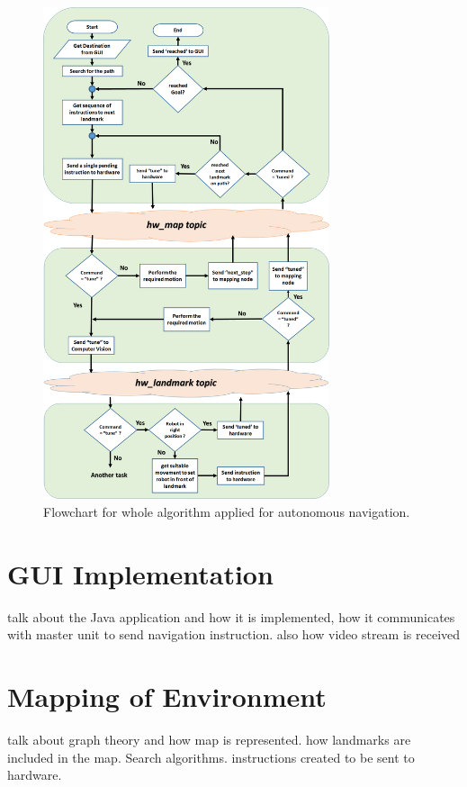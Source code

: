 \documentclass[12pt]{article}
\begin{document}
\newpage

\begin{figure}
	\centering
	\includegraphics[width =0.75\textwidth]{Fig/full-algorithm.png}
	\caption{Flowchart for whole algorithm applied for autonomous navigation.}
	\label{fig:full-algorithm}
\end{figure}

\newpage
\clearpage
\newpage

\section{GUI Implementation}
talk about the Java application and how it is implemented, how it communicates with master unit to send navigation instruction. also how video stream is received

\newpage

\section{Mapping of Environment}
talk about graph theory and how map is represented. 
how landmarks are included in the map. 
Search algorithms.
instructions created to be sent to hardware.
\end{document}
